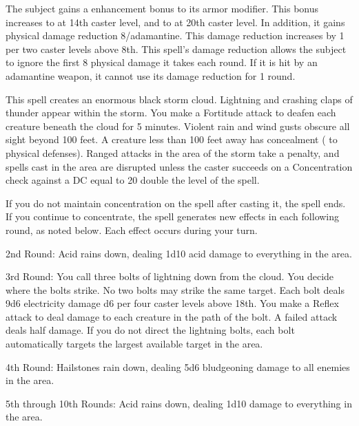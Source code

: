\spelldur{\durshort}
\spelleffect The subject gains a  enhancement bonus to its armor modifier. This bonus increases to  at 14th caster level, and to  at 20th caster level. In addition, it gains physical damage reduction 8/adamantine. This damage reduction increases by 1 per two caster levels above 8th.
\spellnotes This spell's damage reduction allows the subject to ignore the first 8 physical damage it takes each round. If it is hit by an adamantine weapon, it cannot use its damage reduction for 1 round.

\spelleffect This spell creates an enormous black storm cloud. Lightning and crashing claps of thunder appear within the storm. You make a Fortitude attack to deafen each creature beneath the cloud for 5 minutes. Violent rain and wind gusts obscure all sight beyond 100 feet. A creature less than 100 feet away has concealment ( to physical defenses). Ranged attacks in the area of the storm take a  penalty, and spells cast in the area are disrupted unless the caster succeeds on a Concentration check against a DC equal to 20 \add double the level of the spell.
\par If you do not maintain concentration on the spell after casting it, the spell ends. If you continue to concentrate, the spell generates new effects in each following round, as noted below. Each effect occurs during your turn.
\par 2nd Round: Acid rains down, dealing 1d10 acid damage to everything in the area.
\par 3rd Round: You call three bolts of lightning down from the cloud. You decide where the bolts strike. No two bolts may strike the same target. Each bolt deals 9d6 electricity damage \add d6 per four caster levels above 18th. You make a Reflex attack to deal damage to each creature in the path of the bolt. A failed attack deals half damage. If you do not direct the lightning bolts, each bolt automatically targets the largest available target in the area.
\par 4th Round: Hailstones rain down, dealing 5d6 bludgeoning damage to all enemies in the area.
\par 5th through 10th Rounds: Acid rains down, dealing 1d10 damage to everything in the area.

